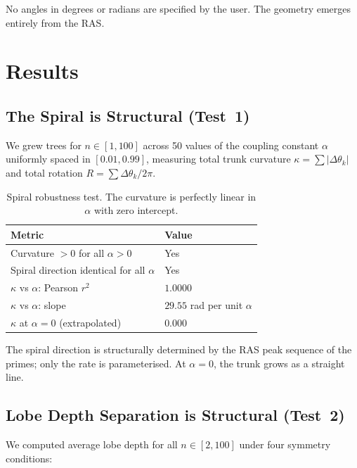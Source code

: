 \documentclass[11pt,a4paper]{article}
\begin{document}
No angles in degrees or radians are specified by the user. The geometry emerges entirely from the RAS.

\section{Results}

\subsection{The Spiral is Structural (Test~1)}

We grew trees for $n \in [1, 100]$ across 50 values of the coupling constant $\alpha$ uniformly spaced in $[0.01, 0.99]$, measuring total trunk curvature $\kappa = \sum|\Delta\theta_k|$ and total rotation $R = \sum\Delta\theta_k / 2\pi$.

\begin{table}[H]
\centering
\begin{tabular}{ll}
\toprule
\textbf{Metric} & \textbf{Value} \\
\midrule
Curvature $> 0$ for all $\alpha > 0$ & Yes \\
Spiral direction identical for all $\alpha$ & Yes \\
$\kappa$ vs $\alpha$: Pearson $r^2$ & $1.0000$ \\
$\kappa$ vs $\alpha$: slope & $29.55$ rad per unit $\alpha$ \\
$\kappa$ at $\alpha = 0$ (extrapolated) & $0.000$ \\
\bottomrule
\end{tabular}
\caption{Spiral robustness test. The curvature is perfectly linear in $\alpha$ with zero intercept.}
\label{tab:spiral}
\end{table}

The spiral direction is structurally determined by the RAS peak sequence of the primes; only the rate is parameterised. At $\alpha = 0$, the trunk grows as a straight line.

\subsection{Lobe Depth Separation is Structural (Test~2)}

We computed average lobe depth for all $n \in [2, 100]$ under four symmetry conditions:
\end{document}
